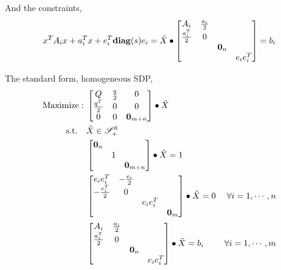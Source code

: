 \documentclass[../main]{subfiles}
\begin{document}
And the constraints,
\begin{equation}
    x^TA_ix + a_i^Tx + e_i^T\mathbf{diag}(s)e_i = \tilde{X} \bullet    \begin{bmatrix}
        A_i             & \frac{a_i}{2} &         &          \\
        \frac{a_i^T}{2} & 0             &         &          \\
                        &               & \bm 0_n &          \\
                        &               &         & e_ie_i^T
    \end{bmatrix} = b_i
\end{equation}

The standard form, homogeneous SDP,
\begin{equation}
    \begin{aligned}
        \mathrm{Maximize:\;}            & \begin{bmatrix}
            Q & \frac{q}{2} & 0 \\ \frac{q^T}{2} & 0 & 0 \\ 0 & 0 & \bm 0_{m+n}
        \end{bmatrix} \bullet \tilde X                               \\
        \mathrm{s.t.} \quad & \tilde{X}  \in \mathscr S^{\tilde{n}}_+                                   \\
                            & \begin{bmatrix}  \bm 0_n &  &  \\  & 1 &  \\  & & \bm 0_{m+n} \end{bmatrix} \bullet \tilde X = 1                           \\
                            & \begin{bmatrix}
            e_ie_i^T         & -\frac{e_i}{2} &          &         \\
            -\frac{e_i^T}{2} & 0              &          &         \\
                             &                & e_ie_i^T &         \\
                             &                &          & \bm 0_m
        \end{bmatrix} \bullet \tilde X = 0   & \forall i=1,\cdots, n \\
                            & \begin{bmatrix}
            A_i             & \frac{a_i}{2} &         &          \\
            \frac{a_i^T}{2} & 0             &         &          \\
                            &               & \bm 0_n &          \\
                            &               &         & e_ie_i^T
        \end{bmatrix}\bullet \tilde{X} = b_i & \forall i=1,\cdots, m \\
    \end{aligned}
\end{equation}
\end{document}
